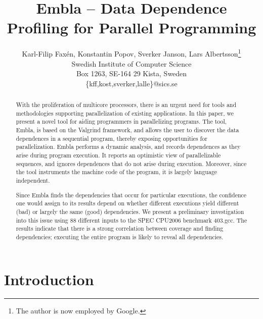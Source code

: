 \documentclass[times, 10pt,twocolumn]{article}
\begin{document}
\title{Embla -- Data Dependence Profiling for Parallel Programming }
\author{Karl-Filip Fax\'en, Konstantin Popov, Sverker Janson, 
       Lars Albertsson\thanks{The author is now employed by Google.}\\
       Swedish Institute of Computer Science\\
       Box 1263, SE-164 29 Kista, Sweden\\
       \{kff,kost,sverker,lalle\}@sics.se}
\date{}
\maketitle

\begin{abstract}

With the proliferation of multicore processors, there is an urgent need for
tools and methodologies supporting parallelization of existing
applications.  In this paper, we present a novel tool for aiding
programmers in parallelizing programs. The tool, Embla, is based on the
Valgrind framework, and allows the user to
discover the data dependences in a sequential program, thereby exposing
opportunities for parallelization.  Embla performs a dynamic analysis,
and records dependences as they
arise during program execution.  It reports an optimistic view of
parallelizable sequences, and ignores dependences that do not arise during
execution.  
Moreover, since the tool instruments the machine code of the program,
it is largely language independent. 

Since Embla finds the dependencies that occur for particular
executions, the confidence one would assign to its results depend on
whether different executions yield different (bad) or largely the same
(good) dependencies. We present a preliminary investigation into this
issue using 88 different inputs to the SPEC CPU2006 benchmark 403.gcc.
The results indicate that there is a strong correlation between coverage
and finding dependencies; executing the entire program is likely to 
reveal all dependencies.
\end{abstract}


\section{Introduction}
\end{document}
